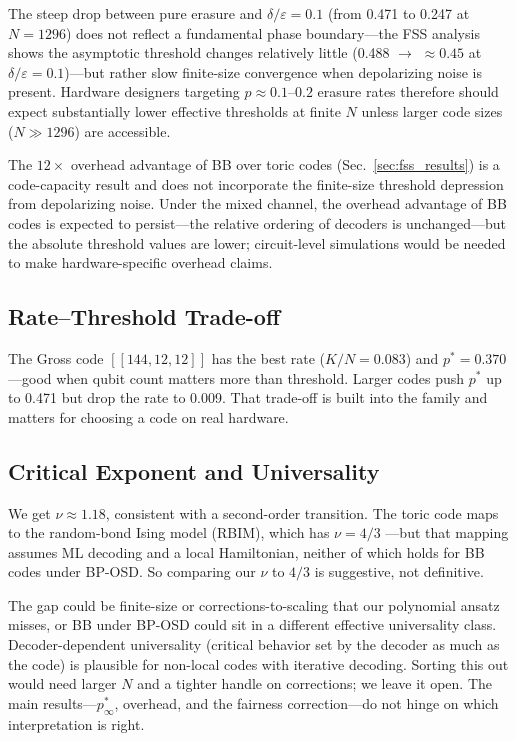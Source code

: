 \documentclass[a4paper]{quantumarticle}
\begin{document}
The steep drop between pure erasure and $\delta/\varepsilon = 0.1$ (from 0.471 to 0.247
at $N = 1296$) does not reflect a fundamental phase boundary---the FSS analysis shows
the asymptotic threshold changes relatively little (0.488 $\to$ $\approx 0.45$ at
$\delta/\varepsilon = 0.1$)---but rather slow finite-size convergence when depolarizing
noise is present.
Hardware designers targeting $p \approx 0.1$--$0.2$ erasure rates therefore should expect
substantially lower effective thresholds at finite $N$ unless larger code sizes
($N \gg 1296$) are accessible.

The $12\times$ overhead advantage of BB over toric codes (Sec.~\ref{sec:fss_results})
is a code-capacity result and does not incorporate the finite-size threshold depression
from depolarizing noise.
Under the mixed channel, the overhead advantage of BB codes is expected to
persist---the relative ordering of decoders is unchanged---but the absolute threshold
values are lower; circuit-level simulations would be needed to make hardware-specific
overhead claims.

\subsection{Rate--Threshold Trade-off}

The Gross code $[[144,12,12]]$ has the best rate ($K/N = 0.083$) and $p^* = 0.370$---good
when qubit count matters more than threshold.
Larger codes push $p^*$ up to 0.471 but drop the rate to 0.009.
That trade-off is built into the family and matters for choosing a code on real hardware.

\subsection{Critical Exponent and Universality}\label{sec:critical_exponent}

We get $\nu \approx 1.18$, consistent with a second-order transition.
The toric code maps to the random-bond Ising model (RBIM), which has $\nu = 4/3$
\cite{dennis2002topological, wang2003quantum}---but that mapping assumes ML decoding and a
local Hamiltonian, neither of which holds for BB codes under BP-OSD.
So comparing our $\nu$ to $4/3$ is suggestive, not definitive.

The gap could be finite-size or corrections-to-scaling that our polynomial ansatz misses, or
BB under BP-OSD could sit in a different effective universality class.
Decoder-dependent universality (critical behavior set by the decoder as much as the code) is
plausible for non-local codes with iterative decoding.
Sorting this out would need larger $N$ and a tighter handle on corrections; we leave it
open.
The main results---$p^*_\infty$, overhead, and the fairness correction---do not hinge on
which interpretation is right.
\end{document}

